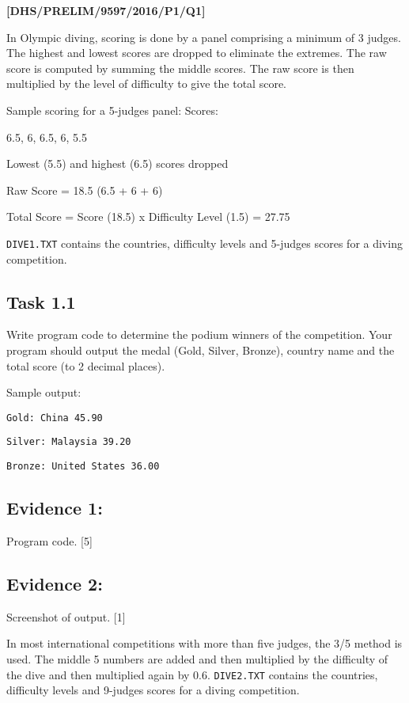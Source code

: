 \item \textbf{{[}DHS/PRELIM/9597/2016/P1/Q1{]} }

In Olympic diving, scoring is done by a panel comprising a minimum
of 3 judges. The highest and lowest scores are dropped to eliminate
the extremes. The raw score is computed by summing the middle scores.
The raw score is then multiplied by the level of difficulty to give
the total score. 

Sample scoring for a 5-judges panel: Scores: 

6.5, 6, 6.5, 6, 5.5 

Lowest (5.5) and highest (6.5) scores dropped 

Raw Score = 18.5 (6.5 + 6 + 6) 

Total Score = Score (18.5) x Difficulty Level (1.5) = 27.75 

\texttt{DIVE1.TXT} contains the countries, difficulty levels and 5-judges
scores for a diving competition. 

\subsection*{Task 1.1 }

Write program code to determine the podium winners of the competition.
Your program should output the medal (Gold, Silver, Bronze), country
name and the total score (to 2 decimal places). 

Sample output:

\noindent %
\noindent\begin{minipage}[t]{1\columnwidth}%
\texttt{Gold: China 45.90 }

\texttt{Silver: Malaysia 39.20}

\texttt{Bronze: United States 36.00 }%
\end{minipage}

\subsection*{Evidence 1: }

Program code. \hfill{}{[}5{]}

\subsection*{Evidence 2: }

Screenshot of output. \hfill{}{[}1{]}

In most international competitions with more than five judges, the
3/5 method is used. The middle 5 numbers are added and then multiplied
by the difficulty of the dive and then multiplied again by 0.6. \texttt{DIVE2.TXT}
contains the countries, difficulty levels and 9-judges scores for
a diving competition. 

